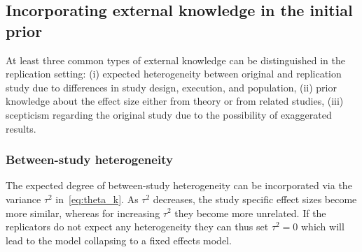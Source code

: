 \subsection{Incorporating external knowledge in the initial prior}
\label{sec:initialPrior}

At least three common types of external knowledge can be distinguished in the
replication setting: (i) expected heterogeneity between original and replication
study due to differences in study design, execution, and population, (ii) prior
knowledge about the effect size either from theory or from related studies,
(iii) scepticism regarding the original study due to the possibility of
exaggerated results.



\subsubsection{Between-study heterogeneity}
\label{sec:heterogeneity}
The expected degree of between-study heterogeneity can be incorporated via the
variance $\tau^2$ in~\eqref{eq:theta_k}. As $\tau^{2}$ decreases, the study
specific effect sizes become more similar, whereas for increasing $\tau^{2}$
they become more unrelated. If the replicators do not expect any heterogeneity
they can thus set $\tau^{2} = 0$ which will lead to the model collapsing to a
fixed effects model.

